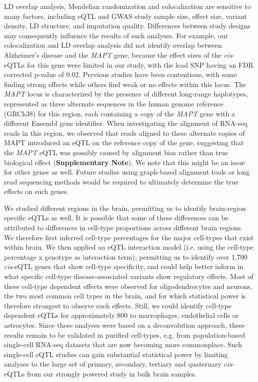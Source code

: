 {LD overlap analysis, Mendelian randomization and colocalization are sensitive to many factors, including eQTL and GWAS study sample size, effect size, variant density, LD structure, and imputation quality. Differences between study designs may consequently influence the results of such analyses. For example, our colocalization and LD overlap analysis did not identify overlap between Alzheimer’s disease and the \emph{MAPT} gene, because the effect sizes of the \emph{cis}-eQTLs for this gene were limited in our study, with the lead SNP having an FDR corrected p-value of 0.02. Previous studies have been contentious, with some finding strong effects\cite{wangComprehensiveFunctionalGenomic2018,ngXQTLMapIntegrates2017} while others find weak or no effects within this locus\cite{aguetGeneticEffectsGene2017,siebertsLargeEQTLMetaanalysis2020}. The \emph{MAPT} locus is characterized by the presence of different long-range haplotypes, represented as three alternate sequences in the human genome reference (GRCh38) for this region, each containing a copy of the \emph{MAPT} gene with a different Ensembl gene identifier. When investigating the alignment of RNA-seq reads in this region, we observed that reads aligned to these alternate copies of MAPT introduced an eQTL on the reference copy of the gene, suggesting that the \emph{MAPT} eQTL was possibly caused by alignment bias rather than true biological effect (\textbf{Supplementary Note}). We note that this might be an issue for other genes as well. Future studies using graph-based alignment tools or long read sequencing methods would be required to ultimately determine the true effects on such genes. 

We studied different regions in the brain, permitting us to identify brain-region specific eQTLs as well. It is possible that some of these differences can be attributed to differences in cell-type proportions across different brain regions. We therefore first inferred cell-type percentages for the major cell-types that exist within brain. We then applied an eQTL interaction model (i.e. using the cell-type percentage x genotype as interaction term), permitting us to identify over 1,700 \emph{cis}-eQTL genes that show cell-type specificity, and could help better inform in what specific cell-type disease-associated variants show regulatory effects. Most of these cell-type dependent effects were observed for oligodendrocytes and neurons, the two most common cell types in the brain, and for which statistical power is therefore strongest to observe such effects. Still, we could identify cell-type dependent eQTLs for approximately 800 to macrophages, endothelial cells or astrocytes. Since these analyses were based on a deconvolution approach, these results remain to be validated in purified cell-types, e.g. from population-based single-cell RNA-seq datasets that are now becoming more commonplace\cite{wijstSinglecellRNASequencing2018,PopulationscaleSinglecellRNAseq}. Such single-cell eQTL studies can gain substantial statistical power by limiting analyses to the large set of primary, secondary, tertiary and quaternary \emph{cis}-eQTLs from our strongly powered study in bulk brain samples. 

}
